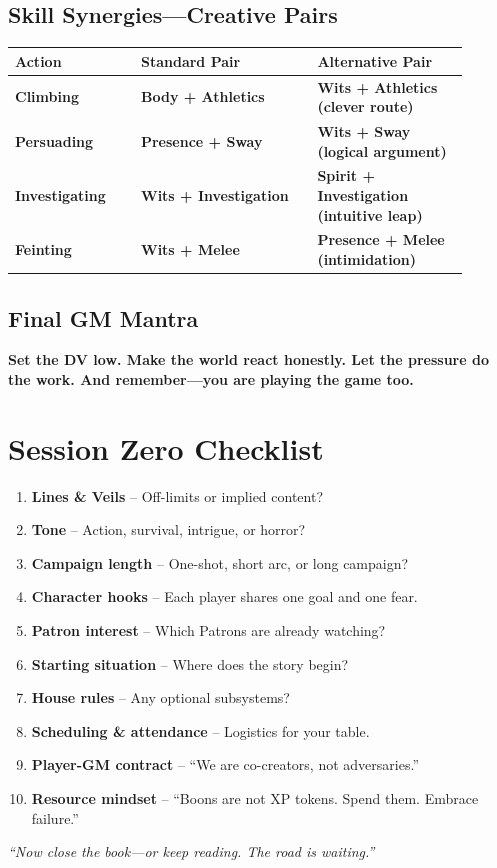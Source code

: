 \documentclass[10pt,twocolumn]{article} %
\begin{document}
\subsection{Skill Synergies—Creative Pairs}
\begin{coretable}
\begin{tabular}{>{\bfseries}p{0.25\linewidth} >{\bfseries}p{0.35\linewidth} >{\bfseries}p{0.3\linewidth}}
\toprule
\textbf{Action} & \textbf{Standard Pair} & \textbf{Alternative Pair} \\
\midrule
Climbing & Body + Athletics & Wits + Athletics (clever route) \\
Persuading & Presence + Sway & Wits + Sway (logical argument) \\
Investigating & Wits + Investigation & Spirit + Investigation (intuitive leap) \\
Feinting & Wits + Melee & Presence + Melee (intimidation) \\
\bottomrule
\end{tabular}
\end{coretable}

\subsection{Final GM Mantra}
\begin{sidebar}
    \textbf{Set the DV low. Make the world react honestly. Let the pressure do the work. And remember—you are playing the game too.}
\end{sidebar}

\section{Session Zero Checklist}
\begin{enumerate}[leftmargin=*]
    \item \textbf{Lines \& Veils} – Off-limits or implied content?
    \item \textbf{Tone} – Action, survival, intrigue, or horror?
    \item \textbf{Campaign length} – One-shot, short arc, or long campaign?
    \item \textbf{Character hooks} – Each player shares one goal and one fear.
    \item \textbf{Patron interest} – Which Patrons are already watching?
    \item \textbf{Starting situation} – Where does the story begin?
    \item \textbf{House rules} – Any optional subsystems?
    \item \textbf{Scheduling \& attendance} – Logistics for your table.
    \item \textbf{Player-GM contract} – ``We are co-creators, not adversaries.''
    \item \textbf{Resource mindset} – ``Boons are not XP tokens. Spend them. Embrace failure.''
\end{enumerate}
\textit{``Now close the book—or keep reading. The road is waiting.''}
\end{document}
